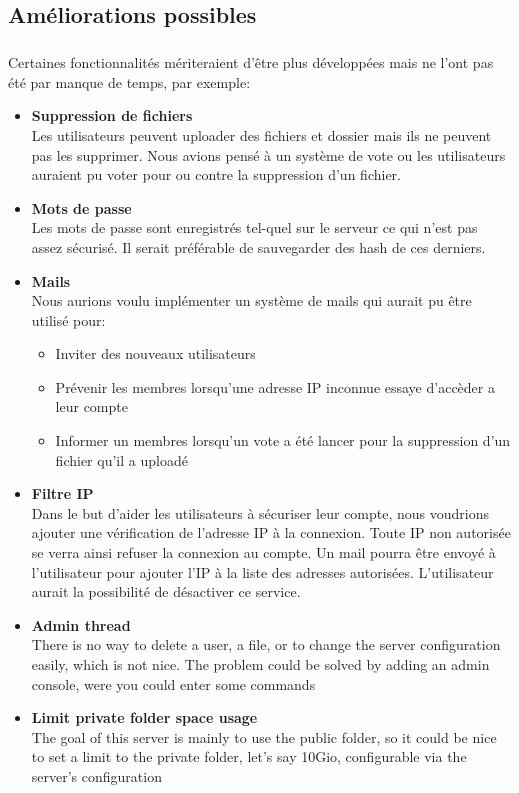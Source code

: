 \documentclass[12pt,a4paper,twoside]{article}
\begin{document}
		\subsection{Améliorations possibles} %
			\subparagraph*{}
				Certaines fonctionnalités mériteraient d'être plus développées mais ne l'ont pas été par manque de temps, par exemple:
				\begin{itemize}
					\item{} \textbf{Suppression de fichiers}\\
						Les utilisateurs peuvent uploader des fichiers et dossier mais ils ne peuvent pas les supprimer. Nous avions pensé à un système de vote ou les utilisateurs auraient pu voter pour ou contre la suppression d'un fichier.
					\item{} \textbf{Mots de passe}\\
						Les mots de passe sont enregistrés tel-quel sur le serveur ce qui n'est pas assez sécurisé. Il serait préférable de sauvegarder des hash de ces derniers.
					\item{} \textbf{Mails}\\
						Nous aurions voulu implémenter un système de mails qui aurait pu être utilisé pour:
						\begin{itemize}
							\item{} Inviter des nouveaux utilisateurs
							\item{} Prévenir les membres lorsqu'une adresse IP inconnue essaye d'accèder a leur compte
							\item{} Informer un membres lorsqu'un vote a été lancer pour la suppression d'un fichier qu'il a uploadé
						\end{itemize}
					\item{} \textbf{Filtre IP}\\
						Dans le but d'aider les utilisateurs à sécuriser leur compte, nous voudrions ajouter une vérification de l'adresse IP à la connexion. Toute IP non autorisée se verra ainsi refuser la connexion au compte. Un mail pourra être envoyé à l'utilisateur pour ajouter l'IP à la liste des adresses autorisées. L'utilisateur aurait la possibilité de désactiver ce service.
					\item{} \textbf{Admin thread}\\
						There is no way to delete a user, a file, or to change the server configuration easily, which is not nice. The problem could be solved by adding an admin console, were you could enter some commands
					\item{} \textbf{Limit private folder space usage}\\
						The goal of this server is mainly to use the public folder, so it could be nice to set a limit to the private folder, let's say 10Gio, configurable via the server's configuration
				\end{itemize}
\end{document}
